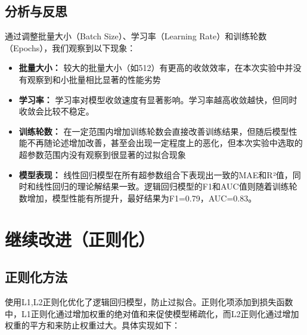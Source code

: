 \documentclass[12pt]{article}
\begin{document}
\subsection{分析与反思}
通过调整批量大小（Batch Size）、学习率（Learning Rate）和训练轮数（Epochs），我们观察到以下现象：

\begin{itemize}
    \item \textbf{批量大小：} 较大的批量大小（如512）有更高的收敛效率，在本次实验中并没有观察到和小批量相比显著的性能劣势
    \item \textbf{学习率：} 学习率对模型收敛速度有显著影响。学习率越高收敛越快，但同时收敛会比较不稳定。
    \item \textbf{训练轮数：} 在一定范围内增加训练轮数会直接改善训练结果，但随后模型性能不再随论述增加改善，甚至会出现一定程度上的恶化，但本次实验中选取的超参数范围内没有观察到很显著的过拟合现象
    \item \textbf{模型表现：} 线性回归模型在所有超参数组合下表现出一致的MAE和R²值，同时和线性回归的理论解结果一致。逻辑回归模型的F1和AUC值则随着训练轮数增加，模型性能有所提升，最好结果为F1=0.79，AUC=0.83。
\end{itemize}

\section{继续改进（正则化）}

\subsection{正则化方法}
使用L1,L2正则化优化了逻辑回归模型，防止过拟合。正则化项添加到损失函数中，L1正则化通过增加权重的绝对值和来促使模型稀疏化，而L2正则化通过增加权重的平方和来防止权重过大。具体实现如下：
\end{document}
